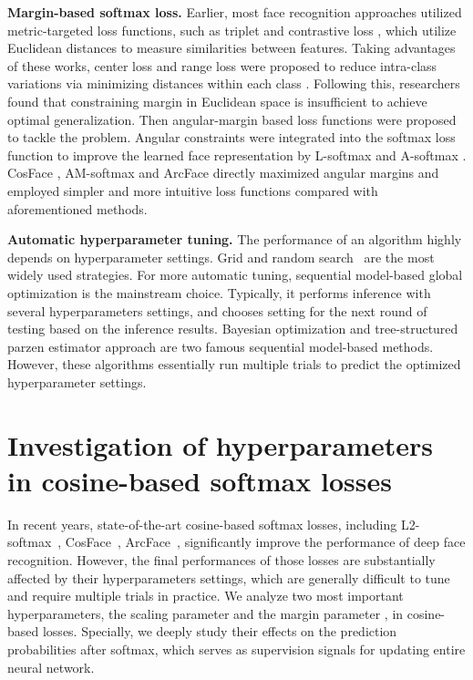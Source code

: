 \documentclass[10pt,twocolumn,letterpaper]{article}
\begin{document}
{\bf Margin-based softmax loss.}
Earlier, most face recognition approaches utilized metric-targeted loss functions, such as triplet \cite{tripletloss2} and contrastive loss \cite{contrastiveloss}, which utilize Euclidean distances to measure similarities between features. Taking advantages of these works, center loss \cite{centerloss} and range loss \cite{Zhang_2017_ICCV} were proposed to reduce intra-class variations via minimizing distances within each class \cite{belhumeur1997eigenfaces}. 
Following this, researchers found that constraining margin in Euclidean space is insufficient to achieve optimal generalization. Then angular-margin based loss functions were proposed to tackle the problem. Angular constraints were integrated into the softmax loss function to improve the learned face representation by L-softmax \cite{L-softmax} and A-softmax \cite{A-softmax}. CosFace \cite{CosFace}, AM-softmax \cite{AM-softmax} and ArcFace \cite{ArcFace} directly maximized angular margins and employed simpler and more intuitive loss functions compared with aforementioned methods. 


{\bf Automatic hyperparameter tuning.}
The performance of an algorithm highly depends on hyperparameter settings. Grid and random search~\cite{bergstra2012random} are the most widely used strategies. For more automatic tuning, sequential model-based global optimization \cite{hutter2011sequential} is the mainstream choice. Typically, it performs inference with several hyperparameters settings, and chooses setting for the next round of testing based on the inference results. Bayesian optimization \cite{snoek2012practical} and tree-structured parzen estimator approach \cite{bergstra2011algorithms} are two famous sequential model-based methods. However, these algorithms essentially run multiple trials to predict the optimized hyperparameter settings.


\section{Investigation of hyperparameters in cosine-based softmax losses}
In recent years, state-of-the-art cosine-based softmax losses, including L2-softmax~\cite{L2-softmax}, CosFace~\cite{CosFace}, ArcFace~\cite{ArcFace}, significantly improve the performance of deep face recognition. However, the final performances of those losses are substantially affected by their hyperparameters settings, which are generally difficult to tune and require multiple trials in practice. We analyze two most important hyperparameters, the scaling parameter  and the margin parameter , in cosine-based losses. Specially, we deeply study their effects on the prediction probabilities after softmax, which serves as supervision signals for updating entire neural network.
\end{document}

